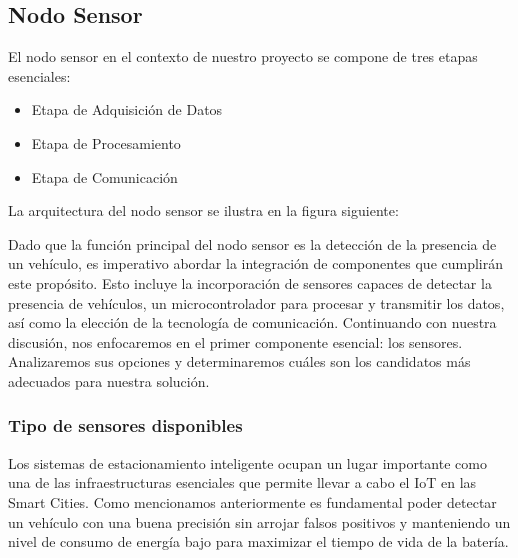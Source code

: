 \subsection{Nodo Sensor}
El nodo sensor en el contexto de nuestro proyecto se compone de tres etapas esenciales:

\begin{itemize}
    \item Etapa de Adquisición de Datos
    \item Etapa de Procesamiento
    \item Etapa de Comunicación
\end{itemize}

La arquitectura del nodo sensor se ilustra en la figura siguiente:


Dado que la función principal del nodo sensor es la detección de la presencia de un vehículo, es imperativo abordar la integración de componentes que cumplirán este propósito. Esto incluye la incorporación de sensores capaces de detectar la presencia de vehículos, un microcontrolador para procesar y transmitir los datos, así como la elección de la tecnología de comunicación. Continuando con nuestra discusión, nos enfocaremos en el primer componente esencial: los sensores. Analizaremos sus opciones y determinaremos cuáles son los candidatos más adecuados para nuestra solución.

\subsubsection{Tipo de sensores disponibles}
Los sistemas de estacionamiento inteligente ocupan un lugar importante como una de las
infraestructuras esenciales que permite llevar a cabo el IoT en las Smart Cities. Como mencionamos anteriormente es fundamental poder detectar un vehículo con una buena precisión sin arrojar falsos positivos y manteniendo un nivel de consumo de energía bajo para maximizar el tiempo de vida de la batería.

